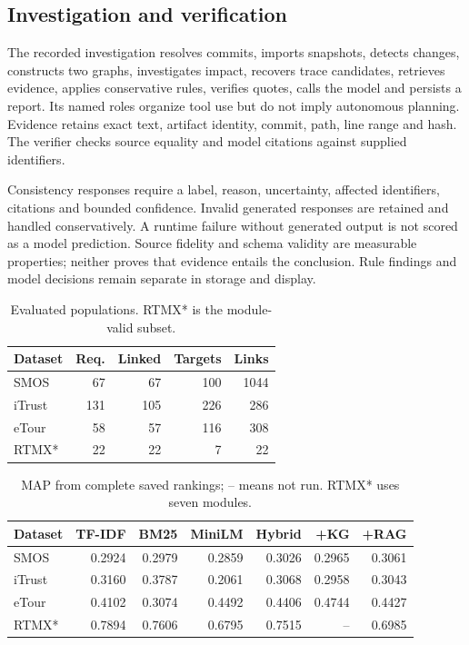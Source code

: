 \documentclass[conference,a4paper]{IEEEtran}
\begin{document}
\subsection{Investigation and verification}
The recorded investigation resolves commits, imports snapshots, detects changes, constructs two graphs, investigates impact, recovers trace candidates, retrieves evidence, applies conservative rules, verifies quotes, calls the model and persists a report. Its named roles organize tool use but do not imply autonomous planning. Evidence retains exact text, artifact identity, commit, path, line range and hash. The verifier checks source equality and model citations against supplied identifiers.

Consistency responses require a label, reason, uncertainty, affected identifiers, citations and bounded confidence. Invalid generated responses are retained and handled conservatively. A runtime failure without generated output is not scored as a model prediction. Source fidelity and schema validity are measurable properties; neither proves that evidence entails the conclusion. Rule findings and model decisions remain separate in storage and display.

\begin{table}[!t]
\centering\footnotesize
\caption{Evaluated populations. RTMX* is the module-valid subset.}\label{tab:data}
\begin{tabular}{lrrrr}\toprule
Dataset & Req. & Linked & Targets & Links \\\midrule
SMOS & 67 & 67 & 100 & 1044 \\
iTrust & 131 & 105 & 226 & 286 \\
eTour & 58 & 57 & 116 & 308 \\
RTMX* & 22 & 22 & 7 & 22 \\
\bottomrule\end{tabular}
\end{table}
\begin{table}[!t]
\centering\footnotesize
\caption{MAP from complete saved rankings; -- means not run. RTMX* uses seven modules.}\label{tab:map}
\begin{tabular}{lrrrrrr}\toprule
Dataset & TF-IDF & BM25 & MiniLM & Hybrid & +KG & +RAG \\\midrule
SMOS & 0.2924 & 0.2979 & 0.2859 & 0.3026 & 0.2965 & 0.3061 \\
iTrust & 0.3160 & 0.3787 & 0.2061 & 0.3068 & 0.2958 & 0.3043 \\
eTour & 0.4102 & 0.3074 & 0.4492 & 0.4406 & 0.4744 & 0.4427 \\
RTMX* & 0.7894 & 0.7606 & 0.6795 & 0.7515 & -- & 0.6985 \\
\bottomrule\end{tabular}
\end{table}
\end{document}
